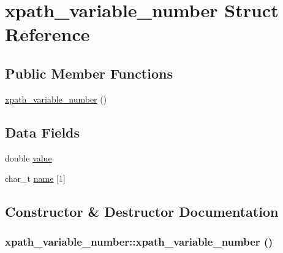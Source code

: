 \hypertarget{structxpath__variable__number}{
\section{xpath\_\-variable\_\-number Struct Reference}
\label{structxpath__variable__number}
}
\subsection*{Public Member Functions}
\begin{DoxyCompactItemize}
\item 
\hyperlink{structxpath__variable__number_ae139f6cc348a1ccb0d1fe97039a2d077}{xpath\_\-variable\_\-number} ()
\end{DoxyCompactItemize}
\subsection*{Data Fields}
\begin{DoxyCompactItemize}
\item 
double \hyperlink{structxpath__variable__number_a49949397348e7c941d88a694ec5c8e57}{value}
\item 
char\_\-t \hyperlink{structxpath__variable__number_a2bf4163dab1a8e233d45677fee987f0f}{name} \mbox{[}1\mbox{]}
\end{DoxyCompactItemize}


\subsection{Constructor \& Destructor Documentation}
\hypertarget{structxpath__variable__number_ae139f6cc348a1ccb0d1fe97039a2d077}{
\subsubsection[{xpath\_\-variable\_\-number}]{\setlength{\rightskip}{0pt plus 5cm}xpath\_\-variable\_\-number::xpath\_\-variable\_\-number ()}}
\label{structxpath__variable__number_ae139f6cc348a1ccb0d1fe97039a2d077}


